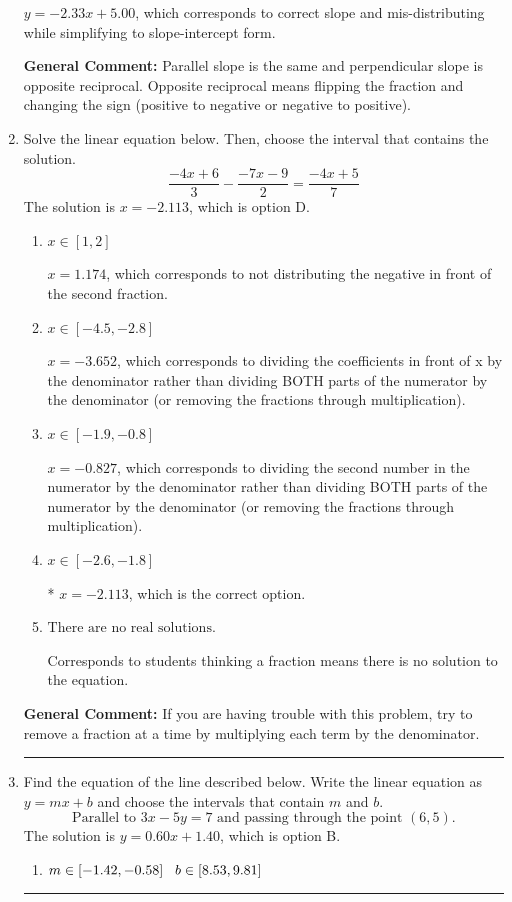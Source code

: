 \documentclass{extbook}[14pt]
\newcommand{\litem}[1]{\item #1

\rule{\textwidth}{0.4pt}}
\begin{document}
\begin{enumerate}
{\begin{enumerate}[label=\Alph*.]
 $y = -2.33x + 5.00$, which corresponds to correct slope and mis-distributing while simplifying to slope-intercept form.
\end{enumerate}

\textbf{General Comment:} Parallel slope is the same and perpendicular slope is opposite reciprocal. Opposite reciprocal means flipping the fraction and changing the sign (positive to negative or negative to positive).
}
\litem{
Solve the linear equation below. Then, choose the interval that contains the solution.
\[ \frac{-4x + 6}{3} - \frac{-7x -9}{2} = \frac{-4x + 5}{7} \]The solution is \( x = -2.113 \), which is option D.\begin{enumerate}[label=\Alph*.]
\item \( x \in [1, 2] \)

 $x = 1.174$, which corresponds to not distributing the negative in front of the second fraction.
\item \( x \in [-4.5, -2.8] \)

 $x = -3.652$, which corresponds to dividing the coefficients in front of x by the denominator rather than dividing BOTH parts of the numerator by the denominator (or removing the fractions through multiplication).
\item \( x \in [-1.9, -0.8] \)

 $x = -0.827$, which corresponds to dividing the second number in the numerator by the denominator rather than dividing BOTH parts of the numerator by the denominator (or removing the fractions through multiplication).
\item \( x \in [-2.6, -1.8] \)

* $x = -2.113$, which is the correct option.
\item \( \text{There are no real solutions.} \)

Corresponds to students thinking a fraction means there is no solution to the equation.
\end{enumerate}

\textbf{General Comment:} If you are having trouble with this problem, try to remove a fraction at a time by multiplying each term by the denominator.
}
\litem{
Find the equation of the line described below. Write the linear equation as $ y=mx+b $ and choose the intervals that contain $m$ and $b$.
\[ \text{Parallel to } 3 x - 5 y = 7 \text{ and passing through the point } (6, 5). \]The solution is \( y = 0.60x + 1.40 \), which is option B.\begin{enumerate}[label=\Alph*.]
\item \( m \in [-1.42, -0.58] \hspace*{3mm} b \in [8.53, 9.81] \)


\end{enumerate}}
\end{enumerate}
\end{document}
